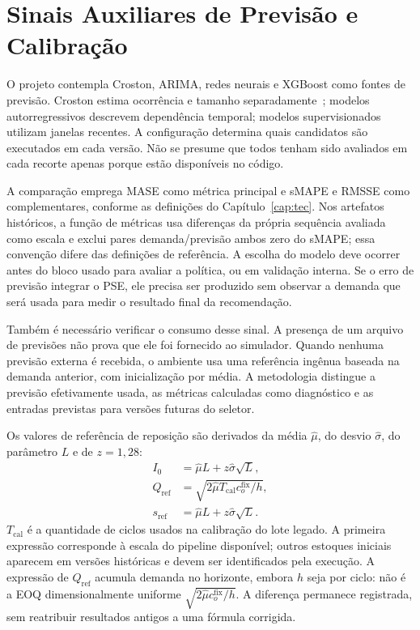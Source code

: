 \section{Sinais Auxiliares de Previsão e Calibração}
\label{sec:sinais_previsao}

O projeto contempla Croston, ARIMA, redes neurais e XGBoost como fontes de previsão. Croston estima ocorrência e tamanho separadamente~\citep{Croston1972ForecastingIntermittentDemand}; modelos autorregressivos descrevem dependência temporal; modelos supervisionados utilizam janelas recentes. A configuração determina quais candidatos são executados em cada versão. Não se presume que todos tenham sido avaliados em cada recorte apenas porque estão disponíveis no código.

A comparação emprega MASE como métrica principal e sMAPE e RMSSE como complementares, conforme as definições do Capítulo~\ref{cap:tec}. Nos artefatos históricos, a função de métricas usa diferenças da própria sequência avaliada como escala e exclui pares demanda/previsão ambos zero do sMAPE; essa convenção difere das definições de referência. A escolha do modelo deve ocorrer antes do bloco usado para avaliar a política, ou em validação interna. Se o erro de previsão integrar o PSE, ele precisa ser produzido sem observar a demanda que será usada para medir o resultado final da recomendação.

Também é necessário verificar o consumo desse sinal. A presença de um arquivo de previsões não prova que ele foi fornecido ao simulador. Quando nenhuma previsão externa é recebida, o ambiente usa uma referência ingênua baseada na demanda anterior, com inicialização por média. A metodologia distingue a previsão efetivamente usada, as métricas calculadas como diagnóstico e as entradas previstas para versões futuras do seletor.

Os valores de referência de reposição são derivados da média $\hat\mu$, do desvio $\hat\sigma$, do parâmetro $L$ e de $z=1{,}28$:
\begin{align}
I_0&=\hat\mu L+z\hat\sigma\sqrt L,\label{eq:I0_metod}\\
Q_{\mathrm{ref}}&=\sqrt{2\hat\mu T_{\mathrm{cal}}c_o^{\mathrm{fix}}/h},\label{eq:qref_metod}\\
s_{\mathrm{ref}}&=\hat\mu L+z\hat\sigma\sqrt L.\label{eq:sref_metod}
\end{align}
$T_{\mathrm{cal}}$ é a quantidade de ciclos usados na calibração do lote legado. A primeira expressão corresponde à escala do pipeline disponível; outros estoques iniciais aparecem em versões históricas e devem ser identificados pela execução. A expressão de $Q_{\mathrm{ref}}$ acumula demanda no horizonte, embora $h$ seja por ciclo: não é a EOQ dimensionalmente uniforme $\sqrt{2\hat\mu c_o^{\mathrm{fix}}/h}$. A diferença permanece registrada, sem reatribuir resultados antigos a uma fórmula corrigida.

